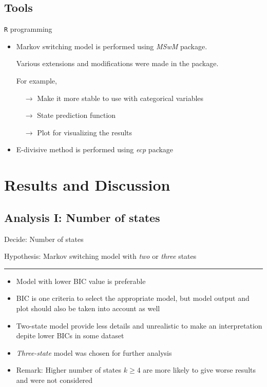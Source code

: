 \documentclass{beamer}
\begin{document}
\subsection{Tools}
\begin{frame}
	\texttt{R} programming
	
	\begin{itemize}
		\item Markov switching model is performed using \textit{MSwM} package.
		
		Various extensions and modifications were made in the package. 
		
		For example, 
		
		$\quad \rightarrow$ Make it more stable to use with categorical variables
		
		$\quad \rightarrow$ State prediction function
		
		$\quad \rightarrow$ Plot for visualizing the results
		
		\item E-divisive method is performed using \textit{ecp} package
	\end{itemize}
	
\end{frame}


\section{Results and Discussion}

\subsection{Analysis I: Number of states}
\begin{frame}
Decide: Number of states

Hypothesis: Markov switching model with \textit{two} or \textit{three} states
\rule{\textwidth}{0.4pt}

\begin{itemize}
	\item Model with lower BIC value is preferable
	\item BIC is one criteria to select the appropriate model, but model output and plot should also be taken into account as well
	\item Two-state model provide less details and unrealistic to make an interpretation depite lower BICs in some dataset
	\item \textit{Three-state} model was chosen for further analysis
	\item Remark: Higher number of states $k\geq4$ are more likely to give worse results and were not considered
\end{itemize}

\end{frame}
\end{document}

